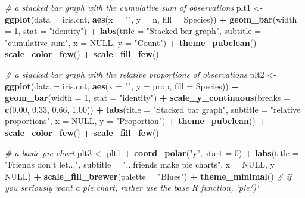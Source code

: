 \documentclass[english,10pt,a4paper,oneside]{book}
\newenvironment{Shaded}{\begin{snugshade}}{\end{snugshade}}
\newcommand{\KeywordTok}[1]{\textcolor[rgb]{0.13,0.29,0.53}{\textbf{#1}}}
\newcommand{\DataTypeTok}[1]{\textcolor[rgb]{0.13,0.29,0.53}{#1}}
\newcommand{\DecValTok}[1]{\textcolor[rgb]{0.00,0.00,0.81}{#1}}
\newcommand{\FloatTok}[1]{\textcolor[rgb]{0.00,0.00,0.81}{#1}}
\newcommand{\StringTok}[1]{\textcolor[rgb]{0.31,0.60,0.02}{#1}}
\newcommand{\CommentTok}[1]{\textcolor[rgb]{0.56,0.35,0.01}{\textit{#1}}}
\newcommand{\OtherTok}[1]{\textcolor[rgb]{0.56,0.35,0.01}{#1}}
\newcommand{\OperatorTok}[1]{\textcolor[rgb]{0.81,0.36,0.00}{\textbf{#1}}}
\newcommand{\NormalTok}[1]{#1}
\theoremstyle{definition}
\theoremstyle{definition}
\theoremstyle{definition}
\theoremstyle{remark}
\begin{document}
\begin{Shaded}
\begin{Highlighting}[]
\CommentTok{# a stacked bar graph with the cumulative sum of observations}
\NormalTok{plt1 <-}\StringTok{ }\KeywordTok{ggplot}\NormalTok{(}\DataTypeTok{data =}\NormalTok{ iris.cnt, }\KeywordTok{aes}\NormalTok{(}\DataTypeTok{x =} \StringTok{""}\NormalTok{, }\DataTypeTok{y =}\NormalTok{ n, }\DataTypeTok{fill =}\NormalTok{ Species)) }\OperatorTok{+}
\StringTok{  }\KeywordTok{geom_bar}\NormalTok{(}\DataTypeTok{width =} \DecValTok{1}\NormalTok{, }\DataTypeTok{stat =} \StringTok{"identity"}\NormalTok{) }\OperatorTok{+}
\StringTok{  }\KeywordTok{labs}\NormalTok{(}\DataTypeTok{title =} \StringTok{"Stacked bar graph"}\NormalTok{, }\DataTypeTok{subtitle =} \StringTok{"cumulative sum"}\NormalTok{,}
       \DataTypeTok{x =} \OtherTok{NULL}\NormalTok{, }\DataTypeTok{y =} \StringTok{"Count"}\NormalTok{) }\OperatorTok{+}
\StringTok{  }\KeywordTok{theme_pubclean}\NormalTok{() }\OperatorTok{+}\StringTok{ }\KeywordTok{scale_color_few}\NormalTok{() }\OperatorTok{+}
\StringTok{  }\KeywordTok{scale_fill_few}\NormalTok{()}

\CommentTok{# a stacked bar graph with the relative proportions of observations}
\NormalTok{plt2 <-}\StringTok{ }\KeywordTok{ggplot}\NormalTok{(}\DataTypeTok{data =}\NormalTok{ iris.cnt, }\KeywordTok{aes}\NormalTok{(}\DataTypeTok{x =} \StringTok{""}\NormalTok{, }\DataTypeTok{y =}\NormalTok{ prop, }\DataTypeTok{fill =}\NormalTok{ Species)) }\OperatorTok{+}
\StringTok{  }\KeywordTok{geom_bar}\NormalTok{(}\DataTypeTok{width =} \DecValTok{1}\NormalTok{, }\DataTypeTok{stat =} \StringTok{"identity"}\NormalTok{) }\OperatorTok{+}
\StringTok{  }\KeywordTok{scale_y_continuous}\NormalTok{(}\DataTypeTok{breaks =} \KeywordTok{c}\NormalTok{(}\FloatTok{0.00}\NormalTok{, }\FloatTok{0.33}\NormalTok{, }\FloatTok{0.66}\NormalTok{, }\FloatTok{1.00}\NormalTok{)) }\OperatorTok{+}
\StringTok{  }\KeywordTok{labs}\NormalTok{(}\DataTypeTok{title =} \StringTok{"Stacked bar graph"}\NormalTok{, }\DataTypeTok{subtitle =} \StringTok{"relative proportions"}\NormalTok{,}
       \DataTypeTok{x =} \OtherTok{NULL}\NormalTok{, }\DataTypeTok{y =} \StringTok{"Proportion"}\NormalTok{) }\OperatorTok{+}
\StringTok{  }\KeywordTok{theme_pubclean}\NormalTok{() }\OperatorTok{+}\StringTok{ }\KeywordTok{scale_color_few}\NormalTok{() }\OperatorTok{+}
\StringTok{  }\KeywordTok{scale_fill_few}\NormalTok{()}


\CommentTok{# a basic pie chart}
\NormalTok{plt3 <-}\StringTok{ }\NormalTok{plt1 }\OperatorTok{+}\StringTok{ }\KeywordTok{coord_polar}\NormalTok{(}\StringTok{"y"}\NormalTok{, }\DataTypeTok{start =} \DecValTok{0}\NormalTok{) }\OperatorTok{+}
\StringTok{  }\KeywordTok{labs}\NormalTok{(}\DataTypeTok{title =} \StringTok{"Friends don't let..."}\NormalTok{, }\DataTypeTok{subtitle =} \StringTok{"...friends make pie charts"}\NormalTok{,}
       \DataTypeTok{x =} \OtherTok{NULL}\NormalTok{, }\DataTypeTok{y =} \OtherTok{NULL}\NormalTok{) }\OperatorTok{+}
\StringTok{  }\KeywordTok{scale_fill_brewer}\NormalTok{(}\DataTypeTok{palette =} \StringTok{"Blues"}\NormalTok{) }\OperatorTok{+}
\StringTok{  }\KeywordTok{theme_minimal}\NormalTok{()}
\CommentTok{# if you seriously want a pie chart, rather use the base R function, `pie()`}


\end{Highlighting}
\end{Shaded}
\end{document}
